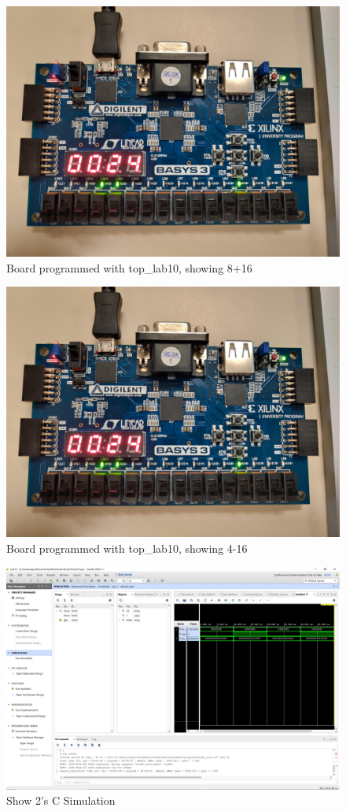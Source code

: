 \documentclass[11pt]{article}
\begin{document}
\begin{figure}[ht]\centering
	\includegraphics[width=.5\textwidth]{pos}
	\caption{Board programmed with top_lab10, showing 8+16}
	\label{fig:bp}			
\end{figure}

\begin{figure}[ht]\centering
	\includegraphics[width=.5\textwidth]{pos}
	\caption{Board programmed with top_lab10, showing 4-16}
	\label{fig:bn}			
\end{figure}

\begin{figure}[ht] \centering	
	\includegraphics[width=1\textwidth,trim=21cm 19cm 0cm 6cm,clip]{show2c_test_scrn}
	\caption{Show 2's C Simulation}
	\label{fig:img3}
\end{figure}
\end{document}
